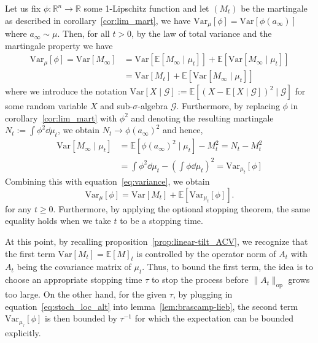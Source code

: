 Let us fix \(\phi : \mathbb{R}^n \to \mathbb{R}\) some 1-Lipschitz function and let \((M_t)\) be the 
martingale as described in corollary~\ref{cor:lim_mart}, we have \(\text{Var}_\mu[\phi] = \text{Var}[\phi(a_\infty)]\) 
where \(a_\infty \sim \mu\).
Then, for all \(t > 0\), by the law of total variance and the martingale property we have
\begin{equation}\label{eq:variance}
  \begin{split}
    \text{Var}_\mu[\phi] = \text{Var}[M_\infty] & = \text{Var}[\mathbb{E}[M_\infty \mid \mu_t]] + \mathbb{E}[\text{Var}[M_\infty \mid \mu_t]]\\
    & = \text{Var}[M_t] + \mathbb{E}[\text{Var}[M_\infty \mid \mu_t]]
  \end{split}
\end{equation}
where we introduce the notation \(\text{Var}[X \mid \mathcal{G}] := \mathbb{E}[(X - \mathbb{E}[X \mid \mathcal{G}])^2 \mid \mathcal{G}]\)
for some random variable \(X\) and sub-\(\sigma\)-algebra \(\mathcal{G}\). Furthermore, by replacing 
\(\phi\) in corollary~\ref{cor:lim_mart} with \(\phi^2\) and denoting the resulting martingale 
\(N_t := \int \phi^2 \dd \mu_t\), we obtain \(N_t \to \phi(a_\infty)^2\) and hence,
\begin{align*}
  \text{Var}[M_\infty \mid \mu_t] & = \mathbb{E}[\phi(a_\infty)^2 \mid \mu_t] - M_t^2 = N_t - M_t^2\\ 
    & = \int \phi^2 \dd \mu_t - \left(\int \phi \dd \mu_t\right)^2 = \text{Var}_{\mu_t}[\phi]
\end{align*}
Combining this with equation~\eqref{eq:variance}, we obtain
\begin{equation}\label{eq:bound}
  \text{Var}_\mu[\phi] = \text{Var}[M_t] + \mathbb{E}[\text{Var}_{\mu_t}[\phi]].
\end{equation}
for any \(t \ge 0\). Furthermore, by applying the optional stopping theorem, the same equality holds 
when we take \(t\) to be a stopping time. 

At this point, by recalling proposition~\ref{prop:linear-tilt_ACV}, we recognize that the first term 
\(\text{Var}[M_t] = \mathbb{E}[M]_t\) is controlled by the operator norm of \(A_t\) with \(A_t\) being the covariance matrix of \(\mu_t\).
Thus, to bound the first term, the idea is to choose an appropriate stopping time \(\tau\) to 
stop the process before \(\|A_t\|_\text{op}\) grows too large. On the other hand, for the given \(\tau\), by plugging in 
equation~\eqref{eq:stoch_loc_alt} into lemma~\ref{lem:brascamp-lieb},
the second term \(\text{Var}_{\mu_\tau}[\phi]\) is then bounded by \(\tau^{-1}\) for which the
expectation can be bounded explicitly.

